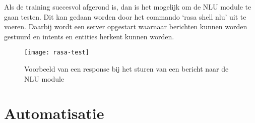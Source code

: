 Als de training succesvol afgerond is, dan is het mogelijk om de NLU module te gaan testen. Dit kan gedaan worden door het commando ‘rasa shell nlu’ uit te voeren. Daarbij wordt een server opgestart waarnaar berichten kunnen worden gestuurd en intents en entities herkent kunnen worden. 

\begin{figure}[H]
    \label{fig:rasa-test}
    \centering
    \texttt{[image: rasa-test]}
    \caption{Voorbeeld van een response bij het sturen van een bericht naar de NLU module}
\end{figure}

\section{Automatisatie}
\label{sec:automatisatie}


























